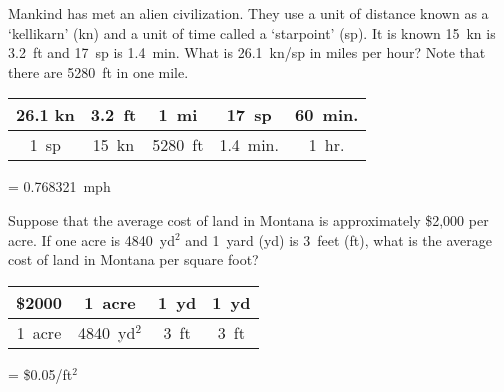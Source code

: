\documentclass[12pt,letterpaper]{exam}
\begin{document}
\begin{questions}
\newpage
\question[10] Mankind has met an alien civilization. They use a unit of distance known as a `kellikarn' (kn) and a unit of time called a `starpoint' (sp). It is known 15~kn is 3.2~ft and 17~sp is 1.4~min. What is 26.1~kn/sp in miles per hour? Note that there are 5280~ft in one mile. \pspace

\sol 
	\begin{table}[!ht]
	\centering
	\begin{tabular}{c|c|c|c|c}
	26.1 kn & 3.2~ft & 1~mi & 17~sp & 60~min. \\ \hline
	1~sp 	& 15~kn & 5280~ft & 1.4~min. & 1~hr.
	\end{tabular}
	= 0.768321~mph
	\end{table}



\newpage
\question[10] Suppose that the average cost of land in Montana is approximately \$2,000 per acre. If one acre is 4840~yd$^2$ and 1~yard (yd) is 3~feet (ft), what is the average cost of land in Montana per square foot? \pspace

\sol
	\begin{table}[!ht]
	\centering
	\begin{tabular}{c|c|c|c}
	\$2000 & 1~acre & 1~yd & 1~yd \\ \hline
	1~acre & 4840~yd$^2$ & 3~ft & 3~ft
	\end{tabular}
	= \$0.05/ft$^2$
	\end{table}


\end{questions}
\end{document}
